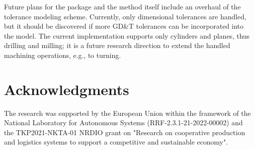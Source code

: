 \documentclass{juliacon}
\begin{document}
Future plans for the package and the method itself include an overhaul of the tolerance modeling scheme.
Currently, only dimensional tolerances are handled, but it should be discovered if more GD\&T tolerances can be incorporated into the model.
The current implementation supports only cylinders and planes, thus drilling and milling; it is a future research direction to extend the handled machining operations, e.g., to turning.

\section{Acknowledgments}
The research was supported by the European Union within the framework of the National Laboratory for Autonomous Systems (RRF-2.3.1-21-2022-00002) and the TKP2021-NKTA-01  NRDIO grant on "Research on cooperative production and logistics systems to support a competitive and sustainable economy".


\end{document}
